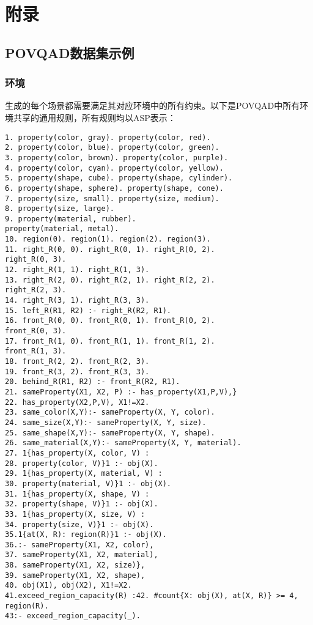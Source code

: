 \chapter{附录}
\section{POVQAD数据集示例}
\subsection{环境}
\label{appendix:environment}
生成的每个场景都需要满足其对应环境中的所有约束。以下是POVQAD中所有环境共享的通用规则，所有规则均以ASP表示：
\begin{lstlisting}
1. property(color, gray). property(color, red).
2. property(color, blue). property(color, green).
3. property(color, brown). property(color, purple).
4. property(color, cyan). property(color, yellow).
5. property(shape, cube). property(shape, cylinder).
6. property(shape, sphere). property(shape, cone).
7. property(size, small). property(size, medium).
8. property(size, large).
9. property(material, rubber).
property(material, metal).
10. region(0). region(1). region(2). region(3).
11. right_R(0, 0). right_R(0, 1). right_R(0, 2).
right_R(0, 3).
12. right_R(1, 1). right_R(1, 3).
13. right_R(2, 0). right_R(2, 1). right_R(2, 2).
right_R(2, 3).
14. right_R(3, 1). right_R(3, 3).
15. left_R(R1, R2) :- right_R(R2, R1).
16. front_R(0, 0). front_R(0, 1). front_R(0, 2).
front_R(0, 3).
17. front_R(1, 0). front_R(1, 1). front_R(1, 2).
front_R(1, 3).
18. front_R(2, 2). front_R(2, 3).
19. front_R(3, 2). front_R(3, 3).
20. behind_R(R1, R2) :- front_R(R2, R1).
21. sameProperty(X1, X2, P) :- has_property(X1,P,V),}
22. has_property(X2,P,V), X1!=X2.
23. same_color(X,Y):- sameProperty(X, Y, color).
24. same_size(X,Y):- sameProperty(X, Y, size).
25. same_shape(X,Y):- sameProperty(X, Y, shape).
26. same_material(X,Y):- sameProperty(X, Y, material).
27. 1{has_property(X, color, V) :
28. property(color, V)}1 :- obj(X).
29. 1{has_property(X, material, V) :
30. property(material, V)}1 :- obj(X).
31. 1{has_property(X, shape, V) :
32. property(shape, V)}1 :- obj(X).
33. 1{has_property(X, size, V) :
34. property(size, V)}1 :- obj(X).
35.1{at(X, R): region(R)}1 :- obj(X).
36.:- sameProperty(X1, X2, color),
37. sameProperty(X1, X2, material),
38. sameProperty(X1, X2, size)},
39. sameProperty(X1, X2, shape),
40. obj(X1), obj(X2), X1!=X2.
41.exceed_region_capacity(R) :42. #count{X: obj(X), at(X, R)} >= 4, region(R).
43:- exceed_region_capacity(_).
\end{lstlisting}
